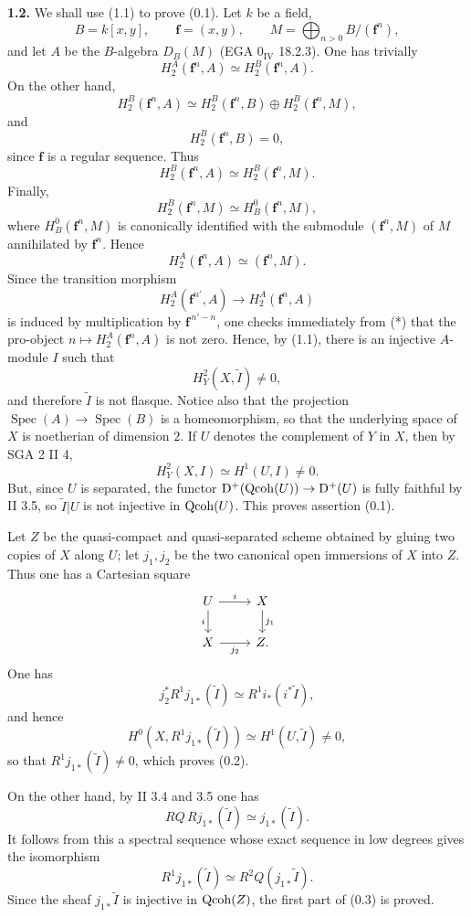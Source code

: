 \documentclass[11pt]{article}
\newcommand{\Spec}{\operatorname{Spec}}
\begin{document}
\textbf{1.2.} We shall use (1.1) to prove (0.1). Let $k$ be a field,
\[
 B=k[x,y],\qquad \mathbf f=(x,y),\qquad
 M=\bigoplus_{n>0}B/(\mathbf f^n),
\]
and let $A$ be the $B$-algebra $D_B(M)$ (EGA $0_{\mathrm{IV}}$ 18.2.3). One has trivially
\[
 H_2^A(\mathbf f^n,A)\simeq H_2^B(\mathbf f^n,A).
\]
On the other hand,
\[
 H_2^B(\mathbf f^n,A)\simeq H_2^B(\mathbf f^n,B)\oplus H_2^B(\mathbf f^n,M),
\]
and
\[
 H_2^B(\mathbf f^n,B)=0,
\]
since $\mathbf f$ is a regular sequence. Thus
\[
 H_2^B(\mathbf f^n,A)\simeq H_2^B(\mathbf f^n,M).
\]
Finally,
\[
 H_2^B(\mathbf f^n,M)\simeq H_B^0(\mathbf f^n,M),
\]
where $H_B^0(\mathbf f^n,M)$ is canonically identified with the submodule $(\mathbf f^n,M)$ of $M$ annihilated by $\mathbf f^n$. Hence
\begin{equation}\tag{*}
 H_2^A(\mathbf f^n,A)\simeq (\mathbf f^n,M).
\end{equation}
Since the transition morphism
\[
 H_2^A(\mathbf f^{n'},A)\longrightarrow H_2^A(\mathbf f^n,A)
\]
is induced by multiplication by $\mathbf f^{\,n'-n}$, one checks immediately from (*) that the pro-object $n\mapsto H_2^A(\mathbf f^n,A)$ is not zero. Hence, by (1.1), there is an injective $A$-module $I$ such that
\[
 H^2_Y(X,\widetilde I)\ne0,
\]
and therefore $\widetilde I$ is not flasque. Notice also that the projection $\Spec(A)\to\Spec(B)$ is a homeomorphism, so that the underlying space of $X$ is noetherian of dimension $2$. If $U$ denotes the complement of $Y$ in $X$, then by SGA 2 II 4,
\[
 H^2_Y(X,I)\simeq H^1(U,I)\ne0.
\]
But, since $U$ is separated, the functor $\mathrm D^+(\operatorname{Qcoh}(U))\to\mathrm D^+(U)$ is fully faithful by II 3.5, so $\widetilde I|U$ is not injective in $\operatorname{Qcoh}(U)$. This proves assertion (0.1).

Let $Z$ be the quasi-compact and quasi-separated scheme obtained by gluing two copies of $X$ along $U$; let $j_1,j_2$ be the two canonical open immersions of $X$ into $Z$. Thus one has a Cartesian square
\[
\begin{tikzcd}
 U \arrow[r,"i"] \arrow[d,"i"'] & X \arrow[d,"j_1"]\\
 X \arrow[r,"j_2"'] & Z .
\end{tikzcd}
\]
One has
\[
 j_2^*R^1j_{1*}(\widetilde I)\simeq R^1i_*(i^*\widetilde I),
\]
and hence
\[
 H^0(X,R^1j_{1*}(\widetilde I))\simeq H^1(U,\widetilde I)\ne0,
\]
so that $R^1j_{1*}(\widetilde I)\ne0$, which proves (0.2).

On the other hand, by II 3.4 and 3.5 one has
\[
 RQ\,Rj_{1*}(\widetilde I)\simeq j_{1*}(\widetilde I).
\]
It follows from this a spectral sequence whose exact sequence in low degrees gives the isomorphism
\[
 R^1j_{1*}(\widetilde I)\simeq R^2Q(j_{1*}\widetilde I).
\]
Since the sheaf $j_{1*}\widetilde I$ is injective in $\operatorname{Qcoh}(Z)$, the first part of (0.3) is proved.
\end{document}
